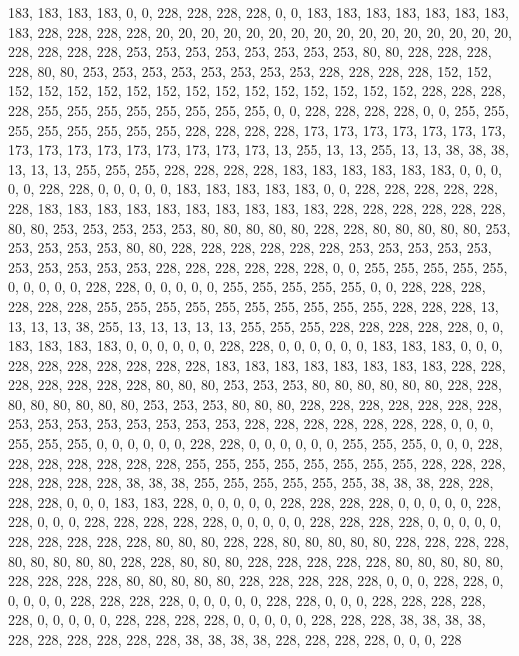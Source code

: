 {	183, 183, 183, 183, 0,   0,   228, 228, 228, 228, 0,   0,   183, 183, 183, 183, 183, 183, 183, 183, 228, 228, 228, 228, 20,  20,  20,  20,  20,  20,  20,  20,  20,  20,  20,  20,  20,  20,  20,  20,  228, 228, 228, 228, 253, 253, 253, 253, 253, 253, 253, 253, 80,  80,  228, 228, 228, 228, 80,  80,  253, 253, 253, 253, 253, 253, 253, 253, 228, 228, 228, 228, 152, 152, 152, 152, 152, 152, 152, 152, 152, 152, 152, 152, 152, 152, 152, 152, 228, 228, 228, 228, 255, 255, 255, 255, 255, 255, 255, 255, 0,   0,   228, 228, 228, 228, 0,   0,   255, 255, 255, 255, 255, 255, 255, 255, 228, 228, 228, 228, 173, 173, 173, 173, 173, 173, 173, 173, 173, 173, 173, 173, 173, 173, 173, 173, 13,  255, 13,  13,  255, 13,  13,  38,  38,  38,  13,  13,  13,  255, 255, 255, 228, 228, 228, 228, 183, 183, 183, 183, 
	183, 183, 0,   0,   0,   0,   0,   228, 228, 0,   0,   0,   0,   0,   183, 183, 183, 183, 183, 0,   0,   228, 228, 228, 228, 228, 228, 183, 183, 183, 183, 183, 183, 183, 183, 183, 183, 228, 228, 228, 228, 228, 228, 80,  80,  253, 253, 253, 253, 253, 80,  80,  80,  80,  80,  228, 228, 80,  80,  80,  80,  80,  253, 253, 253, 253, 253, 80,  80,  228, 228, 228, 228, 228, 228, 253, 253, 253, 253, 253, 253, 253, 253, 253, 253, 228, 228, 228, 228, 228, 228, 0,   0,   255, 255, 255, 255, 255, 0,   0,   0,   0,   0,   228, 228, 0,   0,   0,   0,   0,   255, 255, 255, 255, 255, 0,   0,   228, 228, 228, 228, 228, 228, 255, 255, 255, 255, 255, 255, 255, 255, 255, 255, 228, 228, 228, 13,  13,  13,  13,  38,  255, 13,  13,  13,  13,  13,  255, 255, 255, 228, 228, 228, 228, 228, 0,   0,   183, 183, 183, 
	183, 0,   0,   0,   0,   0,   0,   228, 228, 0,   0,   0,   0,   0,   0,   183, 183, 183, 0,   0,   0,   228, 228, 228, 228, 228, 228, 228, 183, 183, 183, 183, 183, 183, 183, 183, 228, 228, 228, 228, 228, 228, 228, 80,  80,  80,  253, 253, 253, 80,  80,  80,  80,  80,  80,  228, 228, 80,  80,  80,  80,  80,  80,  253, 253, 253, 80,  80,  80,  228, 228, 228, 228, 228, 228, 228, 253, 253, 253, 253, 253, 253, 253, 253, 228, 228, 228, 228, 228, 228, 228, 0,   0,   0,   255, 255, 255, 0,   0,   0,   0,   0,   0,   228, 228, 0,   0,   0,   0,   0,   0,   255, 255, 255, 0,   0,   0,   228, 228, 228, 228, 228, 228, 228, 255, 255, 255, 255, 255, 255, 255, 255, 228, 228, 228, 228, 228, 228, 228, 38,  38,  38,  255, 255, 255, 255, 255, 255, 38,  38,  38,  228, 228, 228, 228, 0,   0,   0,   183, 183, 
	228, 0,   0,   0,   0,   0,   228, 228, 228, 228, 0,   0,   0,   0,   0,   228, 228, 0,   0,   0,   228, 228, 228, 228, 228, 0,   0,   0,   0,   0,   228, 228, 228, 228, 0,   0,   0,   0,   0,   228, 228, 228, 228, 228, 80,  80,  80,  228, 228, 80,  80,  80,  80,  80,  228, 228, 228, 228, 80,  80,  80,  80,  80,  228, 228, 80,  80,  80,  228, 228, 228, 228, 228, 80,  80,  80,  80,  80,  228, 228, 228, 228, 80,  80,  80,  80,  80,  228, 228, 228, 228, 228, 0,   0,   0,   228, 228, 0,   0,   0,   0,   0,   228, 228, 228, 228, 0,   0,   0,   0,   0,   228, 228, 0,   0,   0,   228, 228, 228, 228, 228, 0,   0,   0,   0,   0,   228, 228, 228, 228, 0,   0,   0,   0,   0,   228, 228, 228, 38,  38,  38,  38,  228, 228, 228, 228, 228, 228, 38,  38,  38,  38,  228, 228, 228, 228, 0,   0,   0,   228   
}

